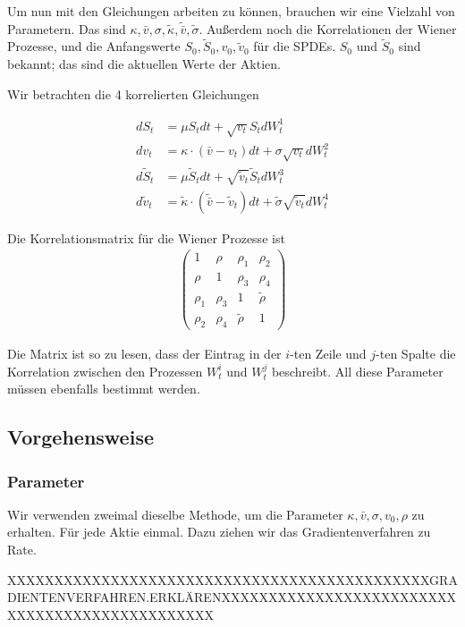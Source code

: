 \documentclass[12pt]{article}
\begin{document}
Um nun mit den Gleichungen arbeiten zu können, brauchen wir eine Vielzahl von Parametern. Das sind $\kappa, \bar{v}, \sigma, \tilde{\kappa}, \tilde{\bar{v}}, \tilde{\sigma}$. Außerdem noch die Korrelationen der Wiener Prozesse, und die Anfangswerte $S_0, \tilde{S}_0, v_0, \tilde{v}_0$ für die SPDEs. $S_0$ und $\tilde{S}_0$ sind bekannt; das sind die aktuellen Werte der Aktien.

Wir betrachten die 4 korrelierten Gleichungen

\begin{align} \label{SPDE}
dS_t &= \mu S_t dt + \sqrt{v_t} S_t dW^1_t \\
dv_t &= \kappa\cdot(\bar{v}-v_t) dt + \sigma \sqrt{v_t}dW^2_t \\
d\tilde{S}_t &= \mu \tilde{S}_t dt + \sqrt{\tilde{v}_t} \tilde{S}_t dW^3_t \\
d\tilde{v}_t &= \tilde{\kappa}\cdot(\tilde{\bar{v}}-\tilde{v}_t) dt + \tilde{\sigma} \sqrt{\tilde{v}_t}dW^4_t
\end{align}

Die Korrelationsmatrix für die Wiener Prozesse ist
\begin{align} \label{korrel}
\left(
\begin{matrix}
1& \rho& \rho_1& \rho_2\\
\rho& 1& \rho_3& \rho_4\\
\rho_1& \rho_3& 1& \tilde{\rho}\\
\rho_2& \rho_4& \tilde{\rho}& 1
\end{matrix}
\right)
\end{align}

Die Matrix ist so zu lesen, dass der Eintrag in der $i$-ten Zeile und $j$-ten Spalte die Korrelation zwischen den Prozessen $W^i_t$ und $W^j_t$ beschreibt. All diese Parameter müssen ebenfalls bestimmt werden.


\subsection{Vorgehensweise}

\subsubsection{Parameter}

Wir verwenden zweimal dieselbe Methode, um die Parameter $\kappa, \bar{v}, \sigma, v_0, \rho$ zu erhalten. Für jede Aktie einmal. Dazu ziehen wir das Gradientenverfahren zu Rate.

XXXXXXXXXXXXXXXXXXXXXXXXXXXXXXXXXXXXXXXXXXXXXGRADIENTENVERFAHREN.ERKLÄRENXXXXXXXXXXXXXXXXXXXXXXXXXXXXXXXXXXXXXXXXXXXXXXX
\end{document}
